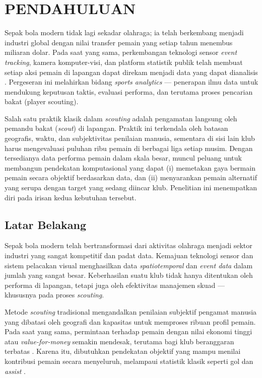 \chapter{PENDAHULUAN}
\label{bab:pendahuluan}

Sepak bola modern tidak lagi sekadar olahraga; ia telah berkembang menjadi industri global dengan nilai transfer pemain yang setiap tahun menembus miliaran dolar. Pada saat yang sama, perkembangan teknologi sensor \emph{event tracking}, kamera komputer-visi, dan platform statistik publik telah membuat setiap aksi pemain di lapangan dapat direkam menjadi data yang dapat dianalisis \parencite{bialkowski2014,decroos2019}. Pergeseran ini melahirkan bidang \emph{sports analytics} --- penerapan ilmu data untuk mendukung keputusan taktis, evaluasi performa, dan terutama proses pencarian bakat (player scouting).

Salah satu praktik klasik dalam \emph{scouting} adalah pengamatan langsung oleh pemandu bakat (\emph{scout}) di lapangan. Praktik ini terkendala oleh batasan geografis, waktu, dan subjektivitas penilaian manusia, sementara di sisi lain klub harus mengevaluasi puluhan ribu pemain di berbagai liga setiap musim. Dengan tersedianya data performa pemain dalam skala besar, muncul peluang untuk membangun pendekatan komputasional yang dapat (i) memetakan gaya bermain pemain secara objektif berdasarkan data, dan (ii) menyarankan pemain alternatif yang serupa dengan target yang sedang diincar klub. Penelitian ini menempatkan diri pada irisan kedua kebutuhan tersebut.

\section{Latar Belakang}
\label{sec:latar-belakang}

Sepak bola modern telah bertransformasi dari aktivitas olahraga menjadi sektor industri yang sangat kompetitif dan padat data. Kemajuan teknologi sensor dan sistem pelacakan visual menghasilkan data \emph{spatiotemporal} dan \emph{event data} dalam jumlah yang sangat besar. Keberhasilan suatu klub tidak hanya ditentukan oleh performa di lapangan, tetapi juga oleh efektivitas manajemen skuad --- khususnya pada proses \emph{scouting}.

Metode \emph{scouting} tradisional mengandalkan penilaian subjektif pengamat manusia yang dibatasi oleh geografi dan kapasitas untuk memproses ribuan profil pemain. Pada saat yang sama, permintaan terhadap pemain dengan nilai ekonomi tinggi atau \emph{value-for-money} semakin mendesak, terutama bagi klub beranggaran terbatas \parencite{mchale2023}. Karena itu, dibutuhkan pendekatan objektif yang mampu menilai kontribusi pemain secara menyeluruh, melampaui statistik klasik seperti gol dan \emph{assist} \parencite{elsharkawi2025}.

